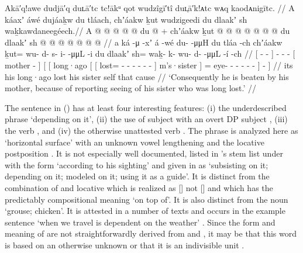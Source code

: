 \ex\label{ex:89-76-beaten-report-saw-sister}%
%
\begingl
	\glpreamble	Akā′q!awe dudjā′q duʟā′tc tc!ākᵘ qot wudzîgī′tî duʟ̣ā′k!ᴀtc wᴀq kaodᴀnigītc. //
	\glpreamble	A káaxʼ áwé dujáaḵw du tláach, chʼáakw ḵut wudzigeedi du dlaakʼ
				sh waḵkawdaneegéech.//
	\gla	{} A  @ {} @ {} {}  @ {}
		 @ {} @ {}
		{} du  @ {} {} +
		{} {} chʼáakw
			{} {} ḵut @  @ {} @ {} @ {} @ {} @ {} @ {} {}
				du dlaakʼ {}
			sh @  @ {} @ {} @ {} @ {} @ {} @ {} {} {} {} //
	\glb	{} a ká -μ -xʼ {} á -wé
		du-  -μμH
		{} du tláa -ch {}
		{} {} chʼáakw
			{} {} ḵut= wu- d- s- i-  -μμL -i {}
				du dlaakʼ {}
			sh= waḵ- k- wu- d-  -μμL -í {} -ch {} //
	\glc	{}[   - - {}]  -
		-  -
		{}[  mother - {}]
		{}[ {}[ long·ago
			{}[ {}[ lost= - - - -
					 - - {}]
				 m’s·sister {}]
			= eye- - - -  - - {}] - {}] //
	\gld	{} its  {} {} {}  {}
		 {} {}
		{} his  {} {}
		{} {} long·ago
			{} {} lost\·  {} {} {} {} {} {} {}
				his sister {}
			self  {} {} {} {} {} \·that {} \·cause {} //
	\glft	‘Consequently he is beaten by his mother, because of reporting seeing of his sister who was long lost.’
		//
\endgl
\xe

The sentence in (\lastx) has at least four interesting features: (i) the underdescribed phrase  ‘depending on it’, (ii) the use of subject  with an overt DP subject , (iii) the verb , and (iv) the otherwise unattested verb .
The phrase  is analyzed here as  ‘horizontal surface’ with an unknown vowel lengthening  and the locative postposition .
It is not especially well documented, listed in \citeauthor{leer:1973}’s stem list under  with the form  ‘according to his sighting’ \parencite[f06/3]{leer:1973} and given in \textcite[\textsc{t}·33]{leer:2001} as  ‘subsisting on it; depending on it; modeled on it; using it as a guide’.
It is distinct from the combination of  and locative  which is realized as  [] not  [] and which has the predictably compositional meaning ‘on top of’.
It is also distinct from the noun  ‘grouse; chicken’.
It is attested in a number of texts and occurs in the example sentence  ‘when we travel is dependent on the weather’ \parencite[233.3317]{story-naish:1973}.
Since the form and meaning of  are not straightforwardly derived from  and , it may be that this word is based on an otherwise unknown  or that it is an indivisible unit .

